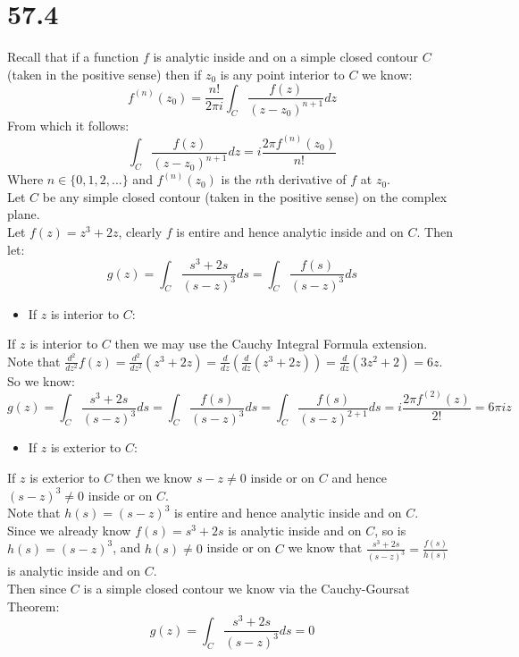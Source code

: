 \documentclass{article}
\begin{document}
\section*{57.4}
\begin{center}
    \doublespacing
    Recall that if a function $f$ is analytic inside and on a simple closed contour $C$ (taken in the positive sense) then if $z_0$ is any point interior to $C$ we know:
    \[f^{(n)} (z_0) =\frac{n!}{2\pi i}\int _C\frac{f(z)}{(z - z_0)^{n+1}} dz\]
    From which it follows:
    \[\int _C\frac{f(z)}{(z - z_0)^{n+1}} dz = i\frac{2\pi f^{(n)} (z_0)}{n!}\]
    Where $n\in\{0, 1, 2, ...\}$ and $f^{(n)} (z_0)$ is the $n$th derivative of $f$ at $z_0$.
    \\Let $C$ be any simple closed contour (taken in the positive sense) on the complex plane.
    \\Let $f(z) = z^3 + 2z$, clearly $f$ is entire and hence analytic inside and on $C$. Then let:
    \[g(z) =\int _C\frac{s^3 + 2s}{(s - z)^3} ds =\int _C\frac{f(s)}{(s - z)^3} ds\]
\end{center}
\begin{itemize}
    \item If $z$ is interior to $C$:
\end{itemize}
\begin{center}
    \doublespacing
    If $z$ is interior to $C$ then we may use the Cauchy Integral Formula extension.
    \\Note that $\frac{d^2}{dz^2} f(z) =\frac{d^2}{dz^2} (z^3 + 2z) =\frac{d}{dz} (\frac{d}{dz} (z^3 + 2z)) =\frac{d}{dz} (3z^2 + 2) = 6z$.
    \\So we know:
    \[g(z) =\int _C\frac{s^3 + 2s}{(s - z)^3} ds =\int _C\frac{f(s)}{(s - z)^3} ds =\int _C\frac{f(s)}{(s - z)^{2 + 1}} ds = i\frac{2\pi f^{(2)} (z)}{2!} = 6\pi i z\]
    \qedsymbol
\end{center}
\begin{itemize}
    \item If $z$ is exterior to $C$:
\end{itemize}
\begin{center}
    \doublespacing
    If $z$ is exterior to $C$ then we know $s - z\neq 0$ inside or on $C$ and hence $(s - z)^3\neq 0$ inside or on $C$.
    \\Note that $h(s) = (s - z)^3$ is entire and hence analytic inside and on $C$.
    \\Since we already know $f(s) = s^3 + 2s$ is analytic inside and on $C$, so is $h(s) = (s - z)^3$, and $h(s)\neq 0$ inside or on $C$ we know that $\frac{s^3 + 2s}{(s - z)^3} =\frac{f(s)}{h(s)}$ is analytic inside and on $C$.
    \\Then since $C$ is a simple closed contour we know via the Cauchy-Goursat Theorem:
    \[g(z) =\int _C\frac{s^3 + 2s}{(s - z)^3} ds = 0\]
    \qedsymbol
\end{center}
\end{document}

